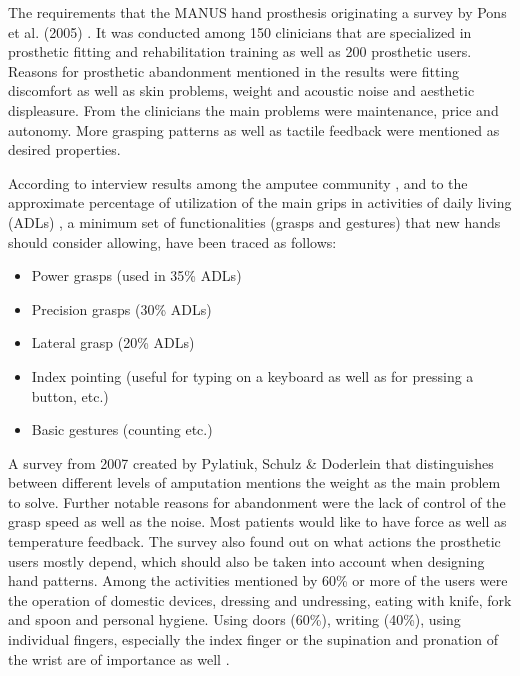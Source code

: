 \documentclass[main]{subfiles}
\begin{document}
The requirements that the MANUS hand prosthesis originating a survey by Pons et al. (2005) \cite{Pons2005}. It was conducted among 150 clinicians that are specialized in prosthetic fitting and rehabilitation training as well as 200 prosthetic users. Reasons for prosthetic abandonment mentioned in the results were fitting discomfort as well as skin problems, weight and acoustic noise and aesthetic displeasure. From the clinicians the main problems were maintenance, price and autonomy. More grasping patterns as well as tactile feedback were mentioned as desired properties. 

According to interview results among the amputee community \cite{Pylatiuk2005}, and to the approximate percentage of utilization of the main grips in activities of daily living (ADLs) \cite{Light2002}, a minimum set of functionalities (grasps and gestures) that new hands should consider allowing, have been traced as follows:
\begin{itemize}
\item Power grasps (used in 35\% ADLs)
\item Precision grasps (30\% ADLs)
\item Lateral grasp (20\% ADLs)
\item Index pointing (useful for typing on a keyboard as well as for pressing a button, etc.)
\item Basic gestures (counting etc.)
\end{itemize}

A survey from 2007 created by Pylatiuk, Schulz \& Doderlein that distinguishes between different levels of amputation mentions the weight as the main problem to solve. Further notable reasons for abandonment were the lack of control of the grasp speed as well as the noise. Most patients would like to have force as well as temperature feedback. The survey also found out on what actions the prosthetic users mostly depend, which should also be taken into account when designing hand patterns. Among the activities mentioned by 60\% or more of the users were the operation of domestic devices, dressing and undressing, eating with knife, fork and spoon and personal hygiene. Using doors (60\%), writing (40\%), using individual fingers, especially the index finger or the supination and pronation of the wrist are of importance as well \cite{Pylatiuk2007}.
\end{document}

